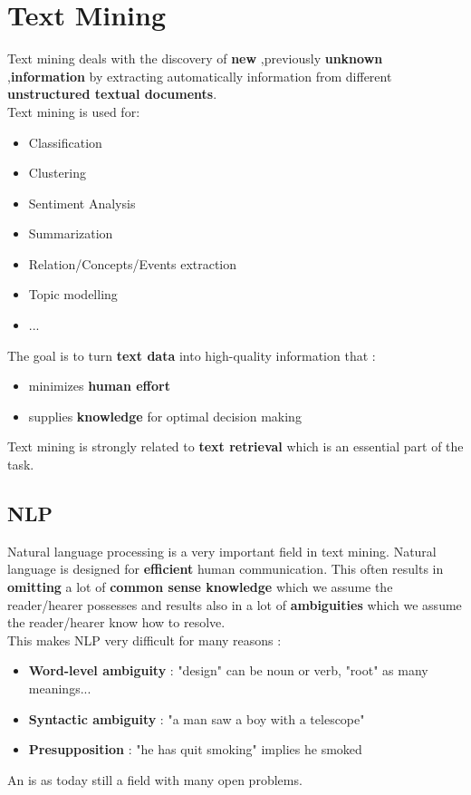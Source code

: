 \newpage
\section{Text Mining}
Text mining deals with the discovery of \textbf{new} ,previously \textbf{unknown} ,\textbf{information} by extracting automatically information from different \textbf{unstructured textual documents}.\\
Text mining is used for:
\begin{itemize}
\item Classification
\item Clustering
\item Sentiment Analysis
\item Summarization
\item Relation/Concepts/Events extraction
\item Topic modelling
\item ...
\end{itemize}
The goal is to turn \textbf{text data} into high-quality information that :
\begin{itemize}
\item minimizes \textbf{human effort}
\item supplies \textbf{knowledge} for optimal decision making
\end{itemize}
Text mining is strongly related to \textbf{text retrieval} which is an essential part of the task.

\subsection{NLP}
Natural language processing is a very important field in text mining.
Natural language is designed for \textbf{efficient} human communication. This often results in \textbf{omitting} a lot of \textbf{common sense knowledge} which we assume the reader/hearer possesses and results also in a lot of \textbf{ambiguities} which we assume the reader/hearer know how to resolve.\\
This makes NLP very difficult for many reasons : 
\begin{itemize}
\item \textbf{Word-level ambiguity} : "design" can be noun or verb, "root" as many meanings...
\item \textbf{Syntactic ambiguity} : "a man saw a boy with a telescope"
\item \textbf{Presupposition} : "he has quit smoking" implies he smoked
\end{itemize}
An is as today still a field with many open problems.

